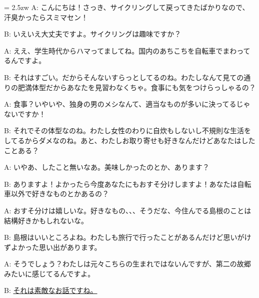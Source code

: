 \documentclass[11pt]{amsart}
\title{}
\author{}
\newenvironment{hangall}[1]{\hangindent = 2.5zw\everypar{\hangindent = 2.5zw}}{}
\begin{document}
\maketitle
\begin{hangall}{}%
A: こんにちは！さっき、サイクリングして戻ってきたばかりなので、汗臭かったらスミマセン！

B: いえいえ大丈夫ですよ。サイクリングは趣味ですか？

A: ええ、学生時代からハマってましてね。国内のあちこちを自転車でまわってるんですよ。

B: それはすごい。だからそんないすらっとしてるのね。わたしなんて見ての通りの肥満体型だからあなたを見習わなくちゃ。食事にも気をつけらっしゃるの？

A: 食事？いやいや、独身の男のメシなんて、適当なものが多いに決ってるじゃないですか！

B: それでその体型なのね。わたし女性のわりに自炊もしないし不規則な生活をしてるからダメなのね。あと、わたしお取り寄せも好きなんだけどあなたはしたことある？

A: いやあ、したこと無いなあ。美味しかったのとか、あります？

B: ありますよ！よかったら今度あなたにもおすそ分けしますよ！あなたは自転車以外で好きなものとかあるの？

A: おすそ分けは嬉しいな。好きなもの、、、そうだな、今住んでる島根のことは結構好きかもしれないな。

B: 島根はいいところよね。わたしも旅行で行ったことがあるんだけど思いがけずよかった思い出があります。

A: そうでしょう？わたしは元々こちらの生まれではないんですが、第二の故郷みたいに感じてるんですよ。

B: \ul{それは素敵なお話ですね。}\end{hangall}
\end{document}
